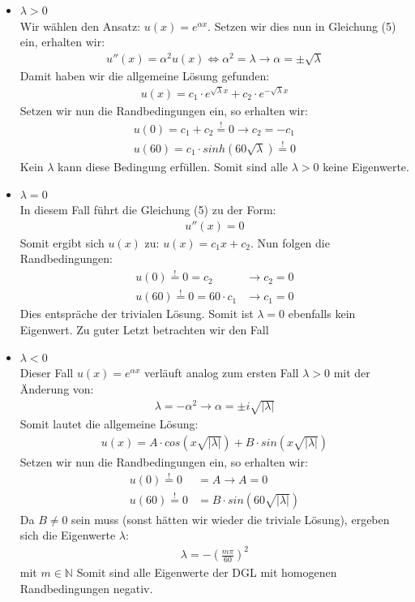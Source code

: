 \documentclass[ngerman]{scrartcl}
\begin{document}
	\begin{itemize}
		\item $\lambda > 0$\\
			Wir wählen den Ansatz: $u(x) = e^{\alpha x}$. Setzen wir dies nun in Gleichung (5) ein, erhalten wir: 
			\begin{align*}
				u''(x) = \alpha^2 u(x) \Leftrightarrow \alpha^2 = \lambda \rightarrow \alpha = \pm \sqrt{\lambda}
			\end{align*}
			Damit haben wir die allgemeine Lösung gefunden: 
			\begin{align}
				u(x) = c_1 \cdot e^{\sqrt{\lambda} x} + c_2 \cdot e^{-\sqrt{\lambda} x}
			\end{align}
			Setzen wir nun die Randbedingungen ein, so erhalten wir: 
			\begin{align*}
				u(0) = c_1 + c_2 \overset{!}{=} 0 \rightarrow c_2 = - c_1\\
				u(60) = c_1 \cdot sinh(60 \sqrt{\lambda}) \overset{!}{=} 0
			\end{align*}
			Kein $\lambda$ kann diese Bedingung erfüllen. Somit sind alle $\lambda > 0$ keine Eigenwerte. 
		\item $\lambda = 0$\\
			In diesem Fall führt die Gleichung (5) zu der Form:
			\begin{align*}
				u''(x) = 0
			\end{align*}
				Somit ergibt sich $u(x)$ zu: $u(x) = c_1 x +c_2$. Nun folgen die Randbedingungen: 
			\begin{align*}
				u(0) \overset{!}{=} 0 = c_2 &\rightarrow c_2 = 0\\
				u(60) \overset{!}{=} 0= 60 \cdot c_1 &\rightarrow c_1 = 0
			\end{align*}
			Dies entspräche der trivialen Lösung. Somit ist $\lambda = 0$ ebenfalls kein Eigenwert. \newline
			Zu guter Letzt betrachten wir den Fall
		\item $\lambda < 0$\\
			Dieser Fall $u(x) = e^{\alpha x}$ verläuft analog zum ersten Fall $\lambda > 0$ mit der Änderung von:
			\begin{align*}
				\lambda = - \alpha^2 \rightarrow \alpha = \pm i \sqrt{|\lambda|}
			\end{align*}
			Somit lautet die allgemeine Lösung:
			\begin{align*}
				u(x) = A \cdot cos\left(x\sqrt{|\lambda|}\right) + B \cdot sin\left(x\sqrt{|\lambda|} \right)
			\end{align*}
			Setzen wir nun die Randbedingungen ein, so erhalten wir: 
			\begin{align*}
				u(0) \overset{!}{=} 0 &= A  \rightarrow A = 0\\
				u(60) \overset{!}{=} 0 &= B \cdot sin(60 \sqrt{|\lambda|})
			\end{align*}
			Da $B \neq 0$ sein muss (sonst hätten wir wieder die triviale Lösung), ergeben sich die Eigenwerte $\lambda$: 
			\begin{align*}
				\lambda = -\left(\frac{m \pi}{60}\right)^2
			\end{align*} mit $m \in \mathbb{N}$
			Somit sind alle Eigenwerte der DGL mit homogenen Randbedingungen negativ.
	\end{itemize}
\end{document}
